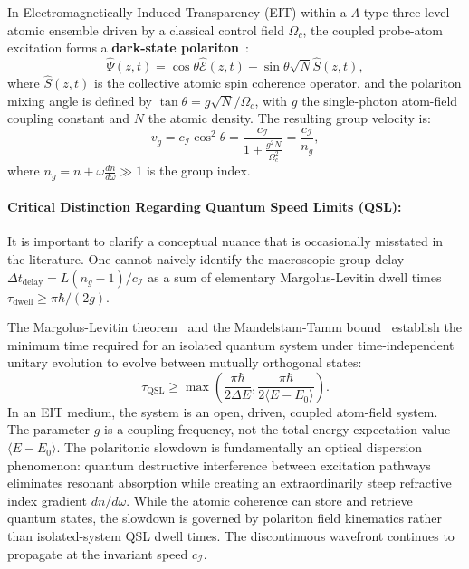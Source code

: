 \documentclass[11pt,a4paper]{article}
\begin{document}
In Electromagnetically Induced Transparency (EIT) within a $\Lambda$-type three-level atomic ensemble driven by a classical control field $\Omega_c$, the coupled probe-atom excitation forms a \textbf{dark-state polariton}~\cite{fleischhauer2000}:
\begin{equation}
\hat{\Psi}(z, t) = \cos\theta \hat{\mathcal{E}}(z, t) - \sin\theta \sqrt{N} \hat{S}(z, t),
\end{equation}
where $\hat{S}(z, t)$ is the collective atomic spin coherence operator, and the polariton mixing angle is defined by $\tan\theta = g\sqrt{N}/\Omega_c$, with $g$ the single-photon atom-field coupling constant and $N$ the atomic density. The resulting group velocity is:
\begin{equation}
v_g = c_{\mathcal{I}} \cos^2\theta = \frac{c_{\mathcal{I}}}{1 + \frac{g^2 N}{\Omega_c^2}} = \frac{c_{\mathcal{I}}}{n_g},
\end{equation}
where $n_g = n + \omega \frac{dn}{d\omega} \gg 1$ is the group index.

\paragraph{Critical Distinction Regarding Quantum Speed Limits (QSL):}
It is important to clarify a conceptual nuance that is occasionally misstated in the literature. One cannot naively identify the macroscopic group delay $\Delta t_{\text{delay}} = L (n_g - 1) / c_{\mathcal{I}}$ as a sum of elementary Margolus-Levitin dwell times $\tau_{\text{dwell}} \ge \pi\hbar / (2g)$. 

The Margolus-Levitin theorem~\cite{margolus1998} and the Mandelstam-Tamm bound~\cite{mandelstam1945} establish the minimum time required for an isolated quantum system under time-independent unitary evolution to evolve between mutually orthogonal states:
\begin{equation}
\tau_{\text{QSL}} \ge \max\left( \frac{\pi\hbar}{2\Delta E}, \frac{\pi\hbar}{2\langle E - E_0 \rangle} \right).
\end{equation}
In an EIT medium, the system is an open, driven, coupled atom-field system. The parameter $g$ is a coupling frequency, not the total energy expectation value $\langle E - E_0 \rangle$. The polaritonic slowdown is fundamentally an optical dispersion phenomenon: quantum destructive interference between excitation pathways eliminates resonant absorption while creating an extraordinarily steep refractive index gradient $dn/d\omega$. While the atomic coherence can store and retrieve quantum states, the slowdown is governed by polariton field kinematics rather than isolated-system QSL dwell times. The discontinuous wavefront continues to propagate at the invariant speed $c_{\mathcal{I}}$.
\end{document}
